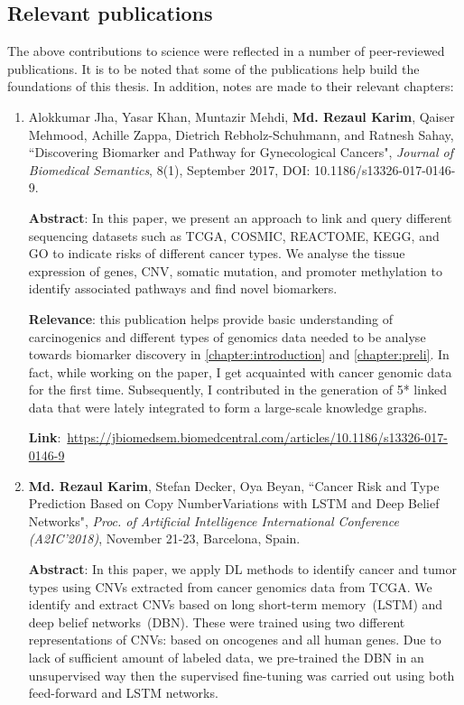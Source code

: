 \subsection{Relevant publications}
The above contributions to science were reflected in a number of peer-reviewed publications. It is to be noted that some of the publications help build the foundations of this thesis. In addition, notes are made to their relevant chapters: 

\begin{enumerate}
	\item {Alokkumar Jha, Yasar Khan, Muntazir Mehdi, \textbf{Md. Rezaul Karim}, Qaiser Mehmood, Achille Zappa, Dietrich Rebholz-Schuhmann, and Ratnesh Sahay, ``Discovering Biomarker and Pathway for Gynecological Cancers", \emph{Journal of Biomedical Semantics}, 8(1), September 2017, DOI: 10.1186/s13326-017-0146-9.} 
	
	\textbf{Abstract}: In this paper, we present an approach to link and query different sequencing datasets such as TCGA, COSMIC, REACTOME, KEGG, and GO to indicate risks of different cancer types. We analyse the tissue expression of genes, CNV, somatic mutation, and promoter methylation to identify associated pathways and find novel biomarkers. 
	
	\textbf{Relevance}: this publication helps provide basic understanding of carcinogenics and different types of genomics data needed to be analyse towards biomarker discovery in \cref{chapter:introduction} and \cref{chapter:preli}. In fact, while working on the paper, I get acquainted with cancer genomic data for the first time. Subsequently, I contributed in the generation of 5* linked data that were lately integrated to form a large-scale knowledge graphs. 
	
	\textbf{Link}:~\url{https://jbiomedsem.biomedcentral.com/articles/10.1186/s13326-017-0146-9}
	
	\item \textbf{Md. Rezaul Karim}, Stefan Decker, Oya Beyan, ``Cancer Risk and Type Prediction Based on Copy NumberVariations with LSTM and Deep Belief Networks", \emph{Proc. of Artificial Intelligence International Conference (A2IC'2018)}, November 21-23, Barcelona, Spain. 
	
	\textbf{Abstract}: In this paper, we apply DL methods to identify cancer and tumor types using CNVs extracted from cancer genomics data from TCGA. We identify and extract CNVs based on long short-term memory~(LSTM) and deep belief networks~(DBN). These were trained using two different representations of CNVs: based on oncogenes and all human genes. Due to lack of sufficient amount of labeled data, we pre-trained the DBN in an unsupervised way then the supervised fine-tuning was carried out using both feed-forward and LSTM networks. 
	

\end{enumerate}
